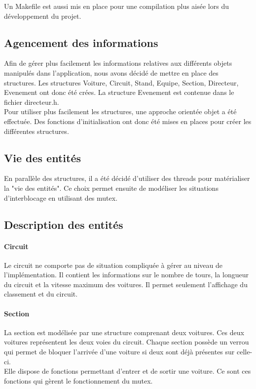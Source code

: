 \documentclass[a4paper, 11pt]{report}
\begin{document}
		Un Makefile est aussi mis en place pour une compilation plus aisée lors du développement du projet.
		
			\subsection{Agencement des informations}
			
			Afin de gérer plus facilement les informations relatives aux différents objets manipulés dans l'application, nous avons décidé de mettre en place des structures. Les structures Voiture, Circuit, Stand, Equipe, Section, Directeur, Evenement ont donc été crées. La structure Evenement est contenue dans le fichier directeur.h. \\
			Pour utiliser plus facilement les structures, une approche orientée objet a été effectuée. Des fonctions d'initialisation ont donc été mises en places pour créer les différentes structures.
			
			\subsection{Vie des entités}
			
			En parallèle des structures, il a été décidé d'utiliser des threads pour matérialiser la "vie des entités". Ce choix permet ensuite de modéliser les situations d'interblocage en utilisant des mutex. \\
			
			\subsection{Description des entités}
			
			\paragraph{Circuit}
			
			Le circuit ne comporte pas de situation compliquée à gérer au niveau de l'implémentation. Il contient les informations sur le nombre de tours, la longueur du circuit et la vitesse maximum des voitures. Il permet seulement l'affichage du classement et du circuit.
			
			\paragraph{Section}
			
			La section est modélisée par une structure comprenant deux voitures. Ces deux voitures représentent les deux voies du circuit. Chaque section possède un verrou qui permet de bloquer l'arrivée d'une voiture si deux sont déjà présentes sur celle-ci. \\
			Elle dispose de fonctions permettant d'entrer et de sortir une voiture. Ce sont ces fonctions qui gèrent le fonctionnement du mutex.
			
\end{document}

